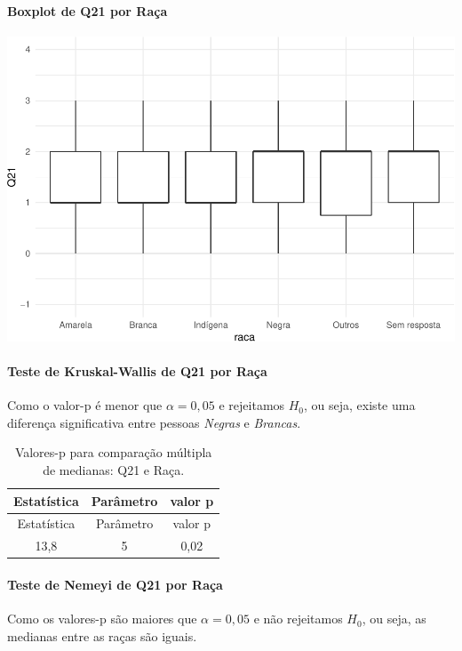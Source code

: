 \documentclass[]{article}
\let\oldparagraph\paragraph
\renewcommand{\paragraph}[1]{\oldparagraph{#1}\mbox{}}
\begin{document}
\hypertarget{boxplot-de-q21-por-rauxe7a}{%
\paragraph{Boxplot de Q21 por Raça}\label{boxplot-de-q21-por-rauxe7a}}

\begin{center}\includegraphics[width=0.75\linewidth]{relatorio_files/figure-latex/unnamed-chunk-351-1} \end{center}

\hypertarget{teste-de-kruskal-wallis-de-q21-por-rauxe7a}{%
\paragraph{Teste de Kruskal-Wallis de Q21 por Raça}\label{teste-de-kruskal-wallis-de-q21-por-rauxe7a}}

Como o valor-p é menor que \(\alpha=0,05\) e rejeitamos \(H_0\), ou seja, existe uma diferença significativa entre pessoas \emph{Negras} e \emph{Brancas}.

\begin{longtable}[]{@{}ccc@{}}
\caption{\label{tab:unnamed-chunk-352}Valores-p para comparação múltipla de medianas: Q21 e Raça.}\tabularnewline
\toprule
Estatística & Parâmetro & valor p\tabularnewline
\midrule
\endfirsthead
\toprule
Estatística & Parâmetro & valor p\tabularnewline
\midrule
\endhead
13,8 & 5 & 0,02\tabularnewline
\bottomrule
\end{longtable}

\hypertarget{teste-de-nemeyi-de-q21-por-rauxe7a}{%
\paragraph{Teste de Nemeyi de Q21 por Raça}\label{teste-de-nemeyi-de-q21-por-rauxe7a}}

Como os valores-p são maiores que \(\alpha=0,05\) e não rejeitamos \(H_0\), ou seja, as medianas entre as raças são iguais.
\end{document}
